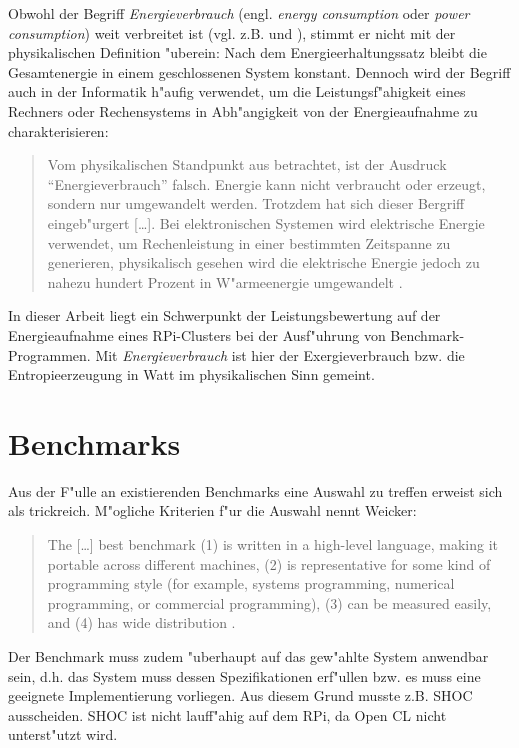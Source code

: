 Obwohl der Begriff \textit{Energieverbrauch} (engl. \textit{energy consumption} oder \textit{power consumption}) weit verbreitet ist (vgl. z.B. \cite{fic13} und \cite{buh08}), stimmt er nicht mit der physikalischen Definition "uberein: Nach dem Energieerhaltungssatz bleibt die Gesamtenergie in einem geschlossenen System konstant. Dennoch wird der Begriff auch in der Informatik h"aufig verwendet, um die Leistungsf"ahigkeit eines Rechners oder Rechensystems in Abh"angigkeit von der Energieaufnahme zu charakterisieren:
\begin{quote}
\onehalfspacing
Vom physikalischen Standpunkt aus betrachtet, ist der Ausdruck "`Energieverbrauch"' falsch. Energie kann nicht verbraucht oder erzeugt, sondern nur umgewandelt werden. Trotzdem hat sich dieser Bergriff eingeb"urgert [\dots]. Bei elektronischen Systemen wird elektrische Energie verwendet, um Rechenleistung in einer bestimmten Zeitspanne zu generieren, physikalisch gesehen wird die elektrische Energie jedoch zu nahezu hundert Prozent in W"armeenergie umgewandelt \cite{lan13}. 
\end{quote}
In dieser Arbeit liegt ein Schwerpunkt der Leistungsbewertung auf der Energieaufnahme eines RPi-Clusters bei der Ausf"uhrung von Benchmark-Programmen. Mit \textit{Energieverbrauch} ist hier der Exergieverbrauch bzw. die Entropieerzeugung in Watt im physikalischen Sinn gemeint.     

\section{Benchmarks}\label{Benchmarks}

Aus der F"ulle an existierenden Benchmarks eine Auswahl zu treffen erweist sich als trickreich. M"ogliche Kriterien f"ur die Auswahl nennt Weicker: 
\begin{quote}
\onehalfspacing
The [\dots] best benchmark (1) is written in a high-level language, making it portable across different machines, (2) is representative for some kind of programming style (for example, systems programming, numerical programming, or commercial programming), (3) can be measured easily, and (4) has wide distribution \cite{wei90}. 
\end{quote}
Der Benchmark muss zudem "uberhaupt auf das gew"ahlte System anwendbar sein, d.h. das System muss dessen Spezifikationen erf"ullen bzw. es muss eine geeignete Implementierung vorliegen. Aus diesem Grund musste z.B. SHOC ausscheiden. SHOC ist nicht lauff"ahig auf dem RPi, da Open CL nicht unterst"utzt wird. 

